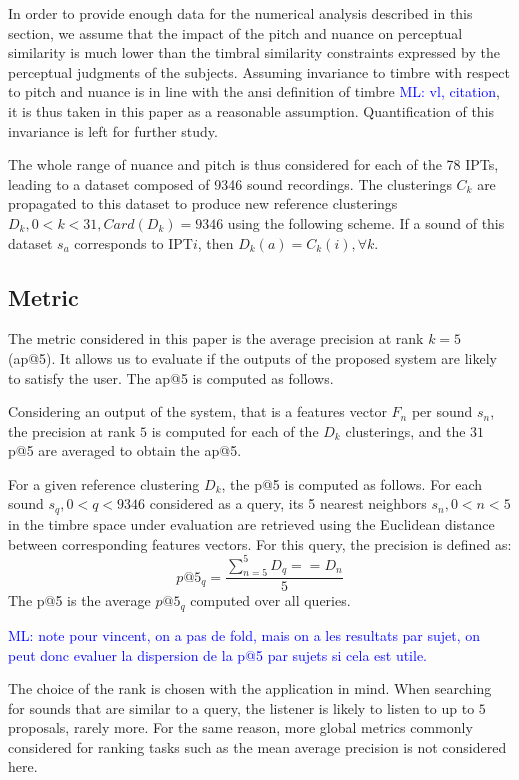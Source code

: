 \documentclass{bmcart}
\newcommand{\ipt}{IPT\xspace}
\newcommand{\ipts}{IPTs\xspace}
\newcommand{\ml}[1]{\textcolor{blue}{ML: #1}}
\begin{document}
In order to provide enough data for the numerical analysis described in this section, we assume that the impact of the pitch and nuance on perceptual similarity is much lower than the timbral similarity constraints expressed by the perceptual judgments of the subjects. Assuming invariance to timbre with respect to pitch and nuance is in line with the ansi definition of timbre \ml{vl, citation}, it is  thus taken in this paper as a reasonable assumption. Quantification of this invariance is left for further study.

The whole range of nuance and pitch is thus considered for each of the 78 \ipts, leading to a dataset composed of 9346 sound recordings. The clusterings $C_k$ are propagated to this dataset to produce new reference clusterings $D_k, 0<k<31, Card(D_k)=9346$ using the following scheme. If a sound of this dataset $s_a$ corresponds to \ipt $i$, then $D_k(a) = C_k(i), \forall k$.

\subsection*{Metric}

The metric considered in this paper is the average precision at rank $k=5$ (ap@5). It allows us to evaluate if the outputs of the proposed system are likely to satisfy the user. The ap@5 is computed as follows.

Considering an output of the system, that is a features vector $F_n$ per sound $s_n$, the precision at rank $5$ is computed for each of the $D_k$ clusterings, and the $31$ p@5 are averaged to obtain the ap@5.

For a given reference clustering $D_k$, the p@5 is computed as follows. For each sound $s_q, 0<q<9346$ considered as a query, its 5 nearest neighbors $s_n, 0<n<5$ in the timbre space under evaluation are retrieved using the Euclidean distance between corresponding features vectors. For this query, the precision is defined as:
$$
p@5_q = \frac{\sum_{n=5}^5 D_q==D_n}{5}
$$
The p@5 is the average $p@5_q$ computed over all queries.

\ml{note pour vincent, on a pas de fold, mais on a les resultats par sujet, on peut donc evaluer la dispersion de la p@5 par sujets si cela est utile.}

The choice of the rank is chosen with the application in mind. When searching for sounds that are similar to a query, the listener is likely to listen to up to $5$ proposals, rarely more. For the same reason, more global metrics commonly considered for ranking tasks such as the mean average precision is not considered here.
\end{document}
